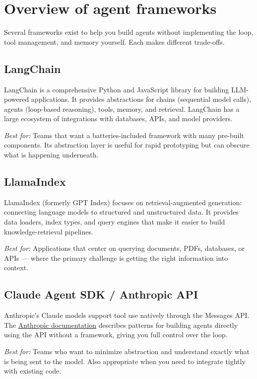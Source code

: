 \section{Overview of agent frameworks}

Several frameworks exist to help you build agents without implementing the loop, tool management, and memory yourself. Each makes different trade-offs.

\subsection{LangChain}

LangChain is a comprehensive Python and JavaScript library for building LLM-powered applications. It provides abstractions for chains (sequential model calls), agents (loop-based reasoning), tools, memory, and retrieval. LangChain has a large ecosystem of integrations with databases, APIs, and model providers.

\emph{Best for:} Teams that want a batteries-included framework with many pre-built components. Its abstraction layer is useful for rapid prototyping but can obscure what is happening underneath.

\subsection{LlamaIndex}

LlamaIndex (formerly GPT Index) focuses on retrieval-augmented generation: connecting language models to structured and unstructured data. It provides data loaders, index types, and query engines that make it easier to build knowledge-retrieval pipelines.

\emph{Best for:} Applications that center on querying documents, PDFs, databases, or APIs --- where the primary challenge is getting the right information into context.

\subsection{Claude Agent SDK / Anthropic API}

Anthropic's Claude models support tool use natively through the Messages API. The \href{https://docs.anthropic.com/en/docs/agents-and-tools/}{Anthropic documentation} describes patterns for building agents directly using the API without a framework, giving you full control over the loop.

\emph{Best for:} Teams who want to minimize abstraction and understand exactly what is being sent to the model. Also appropriate when you need to integrate tightly with existing code.

